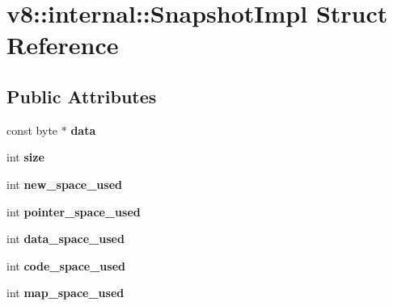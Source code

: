 \hypertarget{structv8_1_1internal_1_1_snapshot_impl}{}\section{v8\+:\+:internal\+:\+:Snapshot\+Impl Struct Reference}
\label{structv8_1_1internal_1_1_snapshot_impl}
\subsection*{Public Attributes}
\begin{DoxyCompactItemize}
\item 
\hypertarget{structv8_1_1internal_1_1_snapshot_impl_afb0e5cc817a66318ad8ba1cd2e29c03d}{}const byte $\ast$ {\bfseries data}\label{structv8_1_1internal_1_1_snapshot_impl_afb0e5cc817a66318ad8ba1cd2e29c03d}

\item 
\hypertarget{structv8_1_1internal_1_1_snapshot_impl_a51cdcd4fa761f76f4c818f2c953ad5a6}{}int {\bfseries size}\label{structv8_1_1internal_1_1_snapshot_impl_a51cdcd4fa761f76f4c818f2c953ad5a6}

\item 
\hypertarget{structv8_1_1internal_1_1_snapshot_impl_a689bc450538b4e5370c678183d2b5f7a}{}int {\bfseries new\+\_\+space\+\_\+used}\label{structv8_1_1internal_1_1_snapshot_impl_a689bc450538b4e5370c678183d2b5f7a}

\item 
\hypertarget{structv8_1_1internal_1_1_snapshot_impl_a57befaa97c4356f4a0191ce9200f0558}{}int {\bfseries pointer\+\_\+space\+\_\+used}\label{structv8_1_1internal_1_1_snapshot_impl_a57befaa97c4356f4a0191ce9200f0558}

\item 
\hypertarget{structv8_1_1internal_1_1_snapshot_impl_a38f6c72e1f754f939099b6182bff4cc6}{}int {\bfseries data\+\_\+space\+\_\+used}\label{structv8_1_1internal_1_1_snapshot_impl_a38f6c72e1f754f939099b6182bff4cc6}

\item 
\hypertarget{structv8_1_1internal_1_1_snapshot_impl_ad59bfd577211160afd8651ea9ace474b}{}int {\bfseries code\+\_\+space\+\_\+used}\label{structv8_1_1internal_1_1_snapshot_impl_ad59bfd577211160afd8651ea9ace474b}

\item 
\hypertarget{structv8_1_1internal_1_1_snapshot_impl_a5abd32e051f4f90d75f23bd85681782a}{}int {\bfseries map\+\_\+space\+\_\+used}\label{structv8_1_1internal_1_1_snapshot_impl_a5abd32e051f4f90d75f23bd85681782a}


\end{DoxyCompactItemize}
